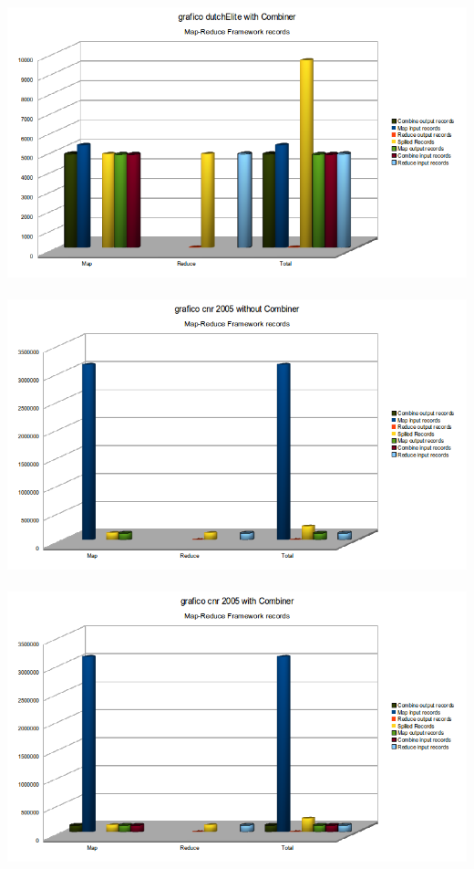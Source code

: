 \documentclass[a4paper,11pt]{report}
\begin{document}
\paragraph{}
\centerline{\includegraphics[width=180mm]{images/grafici/deCombMRRec.png}}
\paragraph{}
\centerline{\includegraphics[width=180mm]{images/grafici/cnrMRRec.png}}
\paragraph{}
\centerline{\includegraphics[width=180mm]{images/grafici/cnrCombMRRec.png}}
\end{document}
